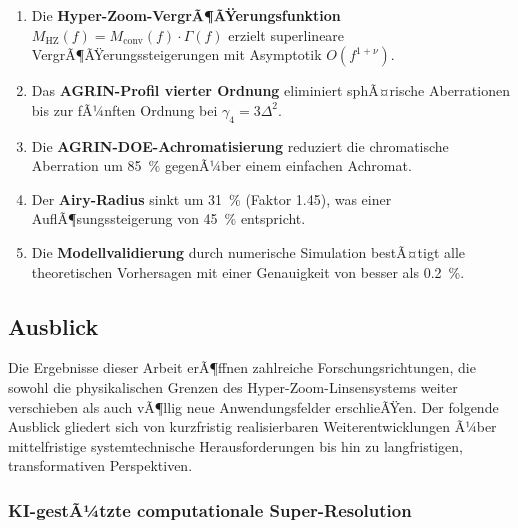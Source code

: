 ﻿\documentclass[12pt,a4paper]{article}
\theoremstyle{definition}
\newcommand{\HZ}{\mathrm{HZ}}
\newcommand{\conv}{\mathrm{conv}}
\begin{document}
	\begin{enumerate}[label=\arabic*.]
		\item Die \textbf{Hyper-Zoom-VergrÃ¶ÃŸerungsfunktion}
		$M_\HZ(f) = M_\conv(f)\cdot\Gamma(f)$ erzielt superlineare
		VergrÃ¶ÃŸerungssteigerungen mit Asym\-ptotik $O(f^{1+\nu})$.
		\item Das \textbf{AGRIN-Profil vierter Ordnung} eliminiert sphÃ¤rische
		Aberrationen bis zur fÃ¼nften Ordnung bei $\gamma_4 = 3\Delta^2$.
		\item Die \textbf{AGRIN-DOE-Achromatisierung} reduziert die chromatische
		Aberration um \SI{85}{\percent} gegenÃ¼ber einem einfachen Achromat.
		\item Der \textbf{Airy-Radius} sinkt um \SI{31}{\percent} (Faktor 1.45),
		was einer AuflÃ¶sungssteigerung von \SI{45}{\percent} entspricht.
		\item Die \textbf{Modellvalidierung} durch numerische Simulation bestÃ¤tigt
		alle theoretischen Vorhersagen mit einer Genauigkeit von besser
		als \SI{0.2}{\percent}.
	\end{enumerate}
	
	\subsection{Ausblick}

	Die Ergebnisse dieser Arbeit erÃ¶ffnen zahlreiche Forschungsrichtungen, die
	sowohl die physikalischen Grenzen des Hyper-Zoom-Linsensystems weiter
	verschieben als auch vÃ¶llig neue Anwendungsfelder erschlieÃŸen.  Der folgende
	Ausblick gliedert sich von kurzfristig realisierbaren Weiterentwicklungen
	Ã¼ber mittelfristige systemtechnische Herausforderungen bis hin zu
	langfristigen, transformativen Perspektiven.

	\subsubsection{KI-gestÃ¼tzte computationale Super-Resolution}
\end{document}
